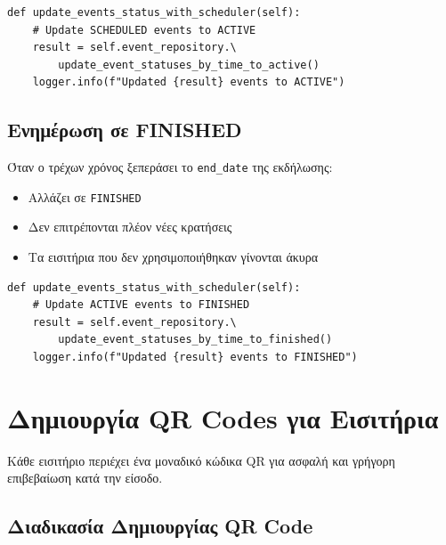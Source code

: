 \documentclass[12pt,a4paper]{report}
\begin{document}
\begin{lstlisting}[caption=Update Event to ACTIVE]
def update_events_status_with_scheduler(self):
    # Update SCHEDULED events to ACTIVE
    result = self.event_repository.\
        update_event_statuses_by_time_to_active()
    logger.info(f"Updated {result} events to ACTIVE")
\end{lstlisting}

\subsection{Ενημέρωση σε FINISHED}

Όταν ο τρέχων χρόνος ξεπεράσει το \texttt{end\_date} της εκδήλωσης:
\begin{itemize}
    \item Αλλάζει σε \texttt{FINISHED}
    \item Δεν επιτρέπονται πλέον νέες κρατήσεις
    \item Τα εισιτήρια που δεν χρησιμοποιήθηκαν γίνονται άκυρα
\end{itemize}

\begin{lstlisting}[caption=Update Event to FINISHED]
def update_events_status_with_scheduler(self):
    # Update ACTIVE events to FINISHED
    result = self.event_repository.\
        update_event_statuses_by_time_to_finished()
    logger.info(f"Updated {result} events to FINISHED")
\end{lstlisting}

\section{Δημιουργία QR Codes για Εισιτήρια}

Κάθε εισιτήριο περιέχει ένα μοναδικό κώδικα QR για ασφαλή και γρήγορη επιβεβαίωση κατά την είσοδο.

\subsection{Διαδικασία Δημιουργίας QR Code}
\end{document}

